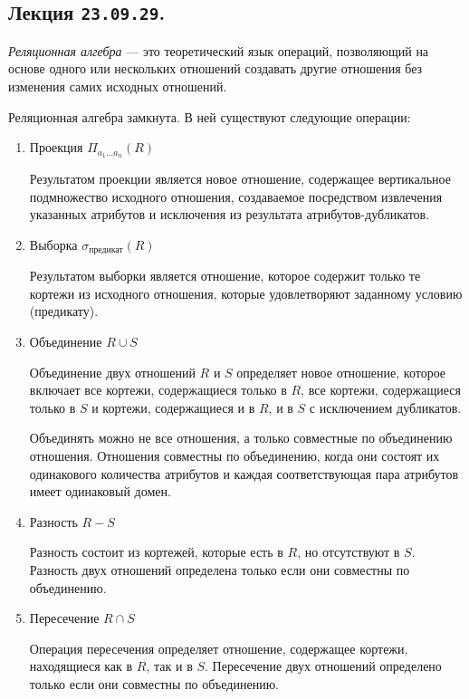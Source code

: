 \subsection{%
  Лекция \texttt{23.09.29}.%
}

\begin{definition}
  \textit{Реляционная алгебра} --- это теоретический язык операций, позволяющий на 
  основе одного или нескольких отношений создавать другие отношения без изменения самих
  исходных отношений.
\end{definition}

Реляционная алгебра замкнута. В ней существуют следующие операции:
\begin{enumerate}
\item
  Проекция \(\Pi_{a_1 \dotsc a_n} (R)\)

  Результатом проекции является новое отношение, содержащее вертикальное
  подмножество исходного отношения, создаваемое посредством извлечения указанных
  атрибутов и исключения из результата атрибутов-дубликатов.

\item
  Выборка \(\sigma_{\text{предикат}} (R)\)

  Результатом выборки является отношение, которое содержит только те кортежи из
  исходного отношения, которые удовлетворяют заданному условию (предикату).

\item
  Объединение \(R \cup S\)

  Объединение двух отношений \(R\) и \(S\) определяет новое отношение, которое
  включает все кортежи, содержащиеся только в \(R\), все кортежи, содержащиеся
  только в \(S\) и кортежи, содержащиеся и в \(R\), и в \(S\) с исключением
  дубликатов.

  Объединять можно не все отношения, а только совместные по объединению
  отношения. Отношения совместны по объединению, когда они состоят их
  одинакового количества атрибутов и каждая соответствующая пара атрибутов имеет
  одинаковый домен.

\item
  Разность \(R - S\)

  Разность состоит из кортежей, которые есть в \(R\), но отсутствуют в \(S\).
  Разность двух отношений определена только если они совместны по объединению.

\item
  Пересечение \(R \cap S\)

  Операция пересечения определяет отношение, содержащее кортежи, находящиеся как
  в \(R\), так и в \(S\). Пересечение двух отношений определено только если они
  совместны по объединению.


\end{enumerate}
